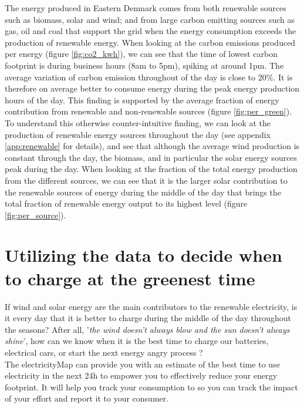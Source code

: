 \documentclass[11pt]{article} %
\begin{document}
The energy produced in Eastern Denmark comes from both renewable sources such as biomass, solar and wind; and from large carbon emitting sources such as gas, oil and coal that support the grid when the energy consumption exceeds the production of renewable energy.
When looking at the carbon emissions produced per energy (figure \ref{fig:co2_kwh}), we can see that the time of lowest carbon footprint is during business hours (8am to 5pm), spiking at around 1pm. The average variation of carbon emission throughout of the day is close to 20\%. It is therefore on average better to consume energy during the peak energy production hours of the day. This finding is supported by the average fraction of energy contribution from renewable and non-renewable sources (figure \ref{fig:per_green}).\\

To understand this otherwise counter-intuitive finding, we can look at the production of renewable energy sources throughout the day (see appendix \ref{app:renewable} for details), and see that although the average wind production is constant through the day, the biomass, and in particular the solar energy sources peak during the day. When looking at the fraction of the total energy production from the different sources, we can see that it is the larger solar contribution to the renewable sources of energy during the middle of the day that brings the total fraction of renewable energy output to its highest level (figure \ref{fig:per_source}).

\clearpage\newpage
\section{Utilizing the data to decide when to charge at the greenest time}
If wind and solar energy are the main contributors to the renewable electricity, is it every day that it is better to charge during the middle of the day throughout the seasons? After all, '\textit{the wind doesn't always blow and the sun doesn't always shine}', how can we know when it is the best time to charge our batteries, electrical cars, or start the next energy angry process ?  \\
The electricityMap can provide you with an estimate of the best time to use electricity in the next 24h to empower you to effectively reduce your energy footprint. It will help you track your consumption to so you can track the impact of your effort and report it to your consumer.
\end{document}
